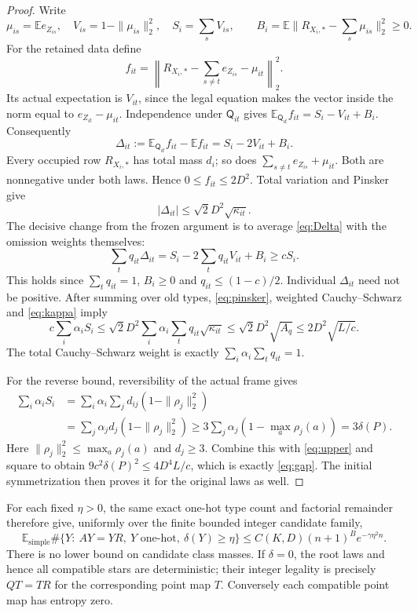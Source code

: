 \documentclass[11pt]{article}
\newcommand{\E}{\mathbb E}
\begin{document}
\begin{proof}
Write
\[
 \mu_{is}=\E e_{Z_{is}},\quad
 V_{is}=1-\|\mu_{is}\|_2^2,\quad S_i=\sum_sV_{is},
 \qquad B_i=\E\bigl\|R_{X_i,*}-\sum_s\mu_{is}\bigr\|_2^2\ge0.
\]
For the retained data define
\[
 f_{it}=\left\|R_{X_i,*}-\sum_{s\ne t}e_{Z_{is}}-\mu_{it}\right\|_2^2.
\]
Its actual expectation is $V_{it}$, since the legal equation makes
the vector inside the norm equal to $e_{Z_{it}}-\mu_{it}$.
Independence under $\mathsf Q_{it}$ gives
$\E_{\mathsf Q_{it}}f_{it}=S_i-V_{it}+B_i$.
Consequently
\begin{equation}\label{eq:Delta}
 \Delta_{it}:=\E_{\mathsf Q_{it}}f_{it}-\E f_{it}
                 =S_i-2V_{it}+B_i.
\end{equation}
Every occupied row $R_{X_i,*}$ has total mass $d_i$; so does
$\sum_{s\ne t}e_{Z_{is}}+\mu_{it}$. Both are nonnegative under both
laws. Hence $0\le f_{it}\le2D^2$. Total variation and Pinsker give
\begin{equation}\label{eq:pinsker}
 |\Delta_{it}|\le \sqrt2D^2\sqrt{\kappa_{it}}.
\end{equation}
The decisive change from the frozen argument is to average
\eqref{eq:Delta} with the omission weights themselves:
\[
 \sum_tq_{it}\Delta_{it}
 =S_i-2\sum_tq_{it}V_{it}+B_i
 \ge c S_i.
\]
This holds since $\sum_tq_{it}=1$, $B_i\ge0$ and
$q_{it}\le(1-c)/2$. Individual $\Delta_{it}$ need not be positive.
After summing over old types, \eqref{eq:pinsker}, weighted
Cauchy--Schwarz and \eqref{eq:kappa} imply
\begin{equation}\label{eq:upper}
 c\sum_i\alpha_iS_i
 \le \sqrt2D^2\sum_i\alpha_i\sum_tq_{it}\sqrt{\kappa_{it}}
 \le \sqrt2D^2\sqrt{A_q}
 \le 2D^2\sqrt{L/c}.
\end{equation}
The total Cauchy--Schwarz weight is exactly
$\sum_i\alpha_i\sum_tq_{it}=1$.

For the reverse bound, reversibility of the actual frame gives
\begin{align*}
 \sum_i\alpha_iS_i
 &=\sum_i\alpha_i\sum_jd_{ij}(1-\|\rho_j\|_2^2)\\
 &=\sum_j\alpha_jd_j(1-\|\rho_j\|_2^2)
 \ge3\sum_j\alpha_j(1-\max_a\rho_j(a))=3\delta(P).
\end{align*}
Here $\|\rho_j\|_2^2\le\max_a\rho_j(a)$ and $d_j\ge3$.
Combine this with \eqref{eq:upper} and square to obtain
$9c^2\delta(P)^2\le4D^4L/c$, which is exactly
\eqref{eq:gap}. The initial symmetrization then proves it for the
original laws as well.
\end{proof}

For each fixed $\eta>0$, the same exact one-hot type count and
factorial remainder therefore give, uniformly over the finite bounded
integer candidate family,
\begin{equation}\label{eq:macro}
 \E_{\mathrm{simple}}\#\{Y:\ AY=YR,\ Y\text{ one-hot},\
             \delta(Y)\ge\eta\}
 \le C(K,D)(n+1)^B e^{-\gamma\eta^2 n}.
\end{equation}
There is no lower bound on candidate class masses. If $\delta=0$,
the root laws and hence all compatible stars are deterministic; their
integer legality is precisely $QT=TR$ for the corresponding point
map $T$. Conversely each compatible point map has entropy zero.
\end{document}
